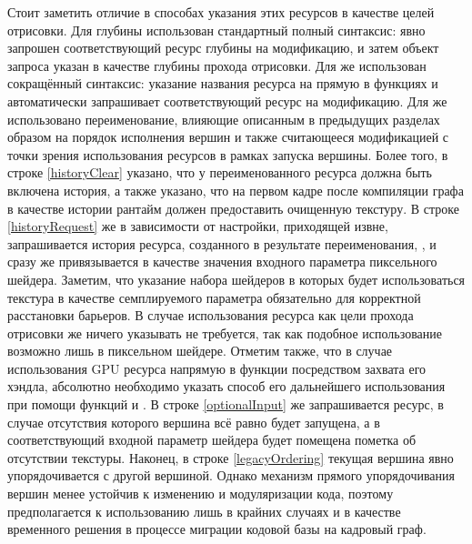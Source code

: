 Стоит заметить отличие в способах указания этих ресурсов в качестве целей отрисовки.
Для глубины использован стандартный полный синтаксис: явно запрошен соответствующий ресурс глубины на модификацию, и затем объект запроса указан в качестве глубины прохода отрисовки.
Для  же использован сокращённый синтаксис: указание названия ресурса на прямую в функциях  и  автоматически запрашивает соответствующий ресурс на модификацию.
Для  же использовано переименование, влияющие описанным в предыдущих разделах образом на порядок исполнения вершин и также считающееся модификацией с точки зрения использования ресурсов в рамках запуска вершины.
Более того, в строке \ref{historyClear} указано, что у переименованного ресурса должна быть включена история, а также указано, что на первом кадре после компиляции графа в качестве истории рантайм должен предоставить очищенную текстуру.
В строке \ref{historyRequest} же в зависимости от настройки, приходящей извне, запрашивается история ресурса, созданного в результате переименования, , и сразу же привязывается в качестве значения входного параметра  пиксельного шейдера.
Заметим, что указание набора шейдеров в которых будет использоваться текстура в качестве семплируемого параметра обязательно для корректной расстановки барьеров.
В случае использования ресурса как цели прохода отрисовки же ничего указывать не требуется, так как подобное использование возможно лишь в пиксельном шейдере.
Отметим также, что в случае использования GPU ресурса напрямую в функции посредством захвата его хэндла, абсолютно необходимо указать способ его дальнейшего использования при помощи функций  и .
В строке \ref{optionalInput} же запрашивается  ресурс, в случае отсутствия которого вершина всё равно будет запущена, а в соответствующий входной параметр шейдера будет помещена пометка об отсутствии текстуры.
Наконец, в строке \ref{legacyOrdering} текущая вершина явно упорядочивается с другой вершиной.
Однако механизм прямого упорядочивания вершин менее устойчив к изменению и модуляризации кода, поэтому предполагается к использованию лишь в крайних случаях и в качестве временного решения в процессе миграции кодовой базы на кадровый граф.

